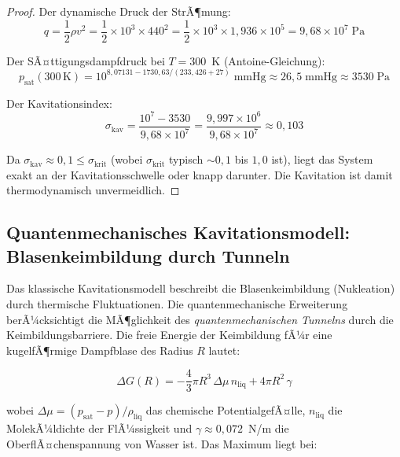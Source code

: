 ﻿\documentclass[12pt,a4paper]{report}
\begin{document}
\begin{proof}
	Der dynamische Druck der StrÃ¶mung:
	\begin{equation}
		q = \frac{1}{2}\rho v^2 = \frac{1}{2}\times10^3\times440^2 = \frac{1}{2}\times10^3\times1{,}936\times10^5 = 9{,}68\times10^7\;\text{Pa}
		\label{eq:dynamischer_druck}
	\end{equation}
	
	Der SÃ¤ttigungsdampfdruck bei $T = 300$~K (Antoine-Gleichung):
	\begin{equation}
		p_\mathrm{sat}(300\,\text{K}) = 10^{8{,}07131 - 1730{,}63/(233{,}426+27)}\;\text{mmHg} \approx 26{,}5\;\text{mmHg} \approx 3530\;\text{Pa}
		\label{eq:dampfdruck}
	\end{equation}
	
	Der Kavitationsindex:
	\begin{equation}
		\sigma_\mathrm{kav} = \frac{10^7 - 3530}{9{,}68\times10^7} = \frac{9{,}997\times10^6}{9{,}68\times10^7} \approx 0{,}103
		\label{eq:sigma_kav_berechnung}
	\end{equation}
	
	Da $\sigma_\mathrm{kav} \approx 0{,}1 \leq \sigma_\mathrm{krit}$ (wobei $\sigma_\mathrm{krit}$ typisch $\sim 0{,}1$ bis $1{,}0$ ist), liegt das System exakt an der Kavitationsschwelle oder knapp darunter. Die Kavitation ist damit thermodynamisch unvermeidlich.
\end{proof}

\subsection{Quantenmechanisches Kavitationsmodell: Blasenkeimbildung durch Tunneln}

Das klassische Kavitationsmodell beschreibt die Blasenkeimbildung (Nukleation) durch thermische Fluktuationen. Die quantenmechanische Erweiterung berÃ¼cksichtigt die MÃ¶glichkeit des \textit{quantenmechanischen Tunnelns} durch die Keimbildungsbarriere. Die freie Energie der Keimbildung fÃ¼r eine kugelfÃ¶rmige Dampfblase des Radius $R$ lautet:

\begin{equation}
	\Delta G(R) = -\frac{4}{3}\pi R^3\,\Delta\mu\,n_\mathrm{liq} + 4\pi R^2\,\gamma
	\label{eq:free_energy_bubble}
\end{equation}

wobei $\Delta\mu = (p_\mathrm{sat} - p)/\rho_\mathrm{liq}$ das chemische PotentialgefÃ¤lle, $n_\mathrm{liq}$ die MolekÃ¼ldichte der FlÃ¼ssigkeit und $\gamma \approx 0{,}072$~N/m die OberflÃ¤chenspannung von Wasser ist. Das Maximum liegt bei:
\end{document}
